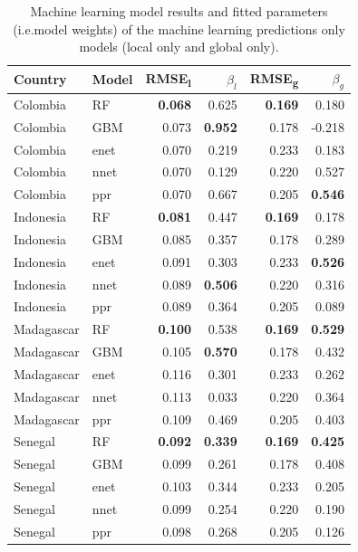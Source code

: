 \documentclass[review]{elsarticle}
\begin{document}
\begin{table}[t!]
\caption{Machine learning model results and fitted parameters (i.e.\thinspace model weights) of the machine learning predictions only models (local only and global only). }
\centering
\small
\begin{tabular}{ll|rr|rr}
     Country          & Model &      RMSE\textsubscript{l} & $\beta_l$ & RMSE\textsubscript{g} & $\beta_g$ \\ \hline
Colombia & RF & \textbf{0.068} & 0.625 &  \textbf{0.169} & 0.180\\
Colombia & GBM & 0.073 & \textbf{0.952} & 0.178& -0.218  \\
Colombia & enet & 0.070 & 0.219 &0.233 & 0.183 \\
Colombia & nnet & 0.070 & 0.129 &0.220 & 0.527 \\
Colombia & ppr & 0.070 & 0.667 & 0.205 &  \textbf{0.546}\vspace{0.3cm}\\
Indonesia & RF& \textbf{0.081} & 0.447 & \textbf{0.169} & 0.178\\
Indonesia & GBM & 0.085 & 0.357 & 0.178& 0.289 \\
Indonesia & enet & 0.091 & 0.303 &0.233 & \textbf{0.526} \\
Indonesia & nnet & 0.089 & \textbf{0.506} &0.220 & 0.316 \\
Indonesia & ppr & 0.089 & 0.364 & 0.205 &  0.089\vspace{0.3cm}\\
Madagascar & RF & \textbf{0.100} & 0.538 &  \textbf{0.169} & \textbf{0.529}\\
Madagascar & GBM & 0.105 & \textbf{0.570} & 0.178& 0.432 \\
Madagascar & enet & 0.116 & 0.301 &0.233 & 0.262 \\
Madagascar & nnet & 0.113 & 0.033 &0.220 & 0.364 \\
Madagascar & ppr & 0.109 & 0.469 & 0.205 &  0.403\vspace{0.3cm}\\ 
Senegal & RF & \textbf{0.092} & \textbf{0.339} & \textbf{0.169} & \textbf{0.425} \\
Senegal & GBM & 0.099 & 0.261& 0.178& 0.408 \\
Senegal & enet& 0.103 & 0.344  &0.233 & 0.205 \\
Senegal & nnet & 0.099 & 0.254 &0.220 & 0.190 \\
Senegal & ppr & 0.098 & 0.268& 0.205 &  0.126\\


\end{tabular}
\label{t:mlresults}
\end{table}
\end{document}
